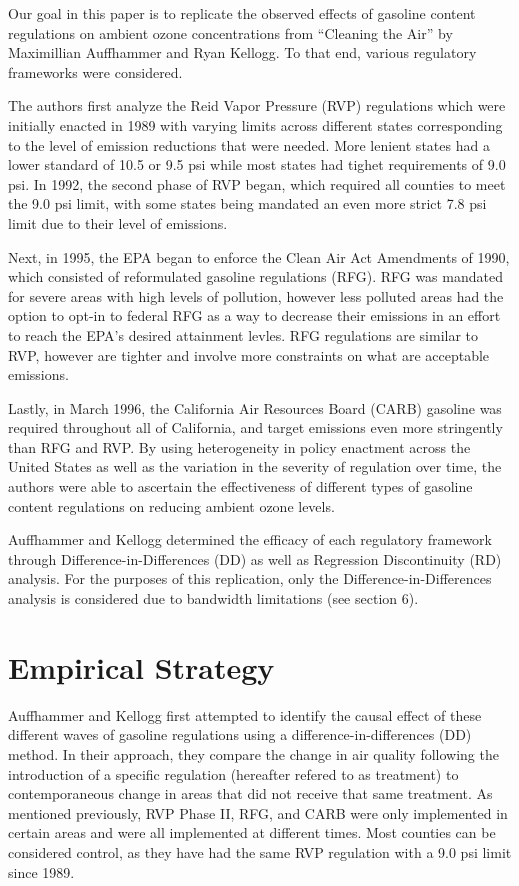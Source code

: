 \documentclass{article}
\begin{document}
Our goal in this paper is to replicate the observed effects of gasoline content regulations on ambient ozone concentrations from “Cleaning the Air” by Maximillian Auffhammer and Ryan Kellogg. To that end, various regulatory frameworks were considered. 

The authors first analyze the Reid Vapor Pressure (RVP) regulations which were initially enacted in 1989 with varying limits across different states corresponding to the level of emission reductions that were needed. More lenient states had a lower standard of 10.5 or 9.5 psi while most states had tighet requirements of 9.0 psi. In 1992, the second phase of RVP began, which required all counties to meet the 9.0 psi limit, with some states being mandated an even more strict 7.8 psi limit due to their level of emissions. 

Next, in 1995, the EPA began to enforce the Clean Air Act Amendments of 1990, which consisted of reformulated gasoline regulations (RFG). RFG was mandated for severe areas with high levels of pollution, however less polluted areas had the option to opt-in to federal RFG as a way to decrease their emissions in an effort to reach the EPA's desired attainment levles. RFG regulations are similar to RVP, however are tighter and involve more constraints on what are acceptable emissions. 

Lastly, in March 1996, the California Air Resources Board (CARB) gasoline was required throughout all of California, and target emissions even more stringently than RFG and RVP. By using heterogeneity in policy enactment across the United States as well as the variation in the severity of regulation over time, the authors were able to ascertain the effectiveness of different types of gasoline content regulations on reducing ambient ozone levels.

Auffhammer and Kellogg determined the efficacy of each regulatory framework through Difference-in-Differences (DD) as well as Regression Discontinuity (RD) analysis. For the purposes of this replication, only the Difference-in-Differences analysis is considered due to bandwidth limitations (see section 6). 

\section{Empirical Strategy}

Auffhammer and Kellogg first attempted to identify the causal effect of these different waves of gasoline regulations using a difference-in-differences (DD) method. In their approach, they compare the change in air quality following the introduction of a specific regulation (hereafter refered to as treatment) to contemporaneous change in areas that did not receive that same treatment. As mentioned previously, RVP Phase II, RFG, and CARB were only implemented in certain areas and were all implemented at different times. Most counties can be considered control, as they have had the same RVP regulation with a 9.0 psi limit since 1989. 
\end{document}
